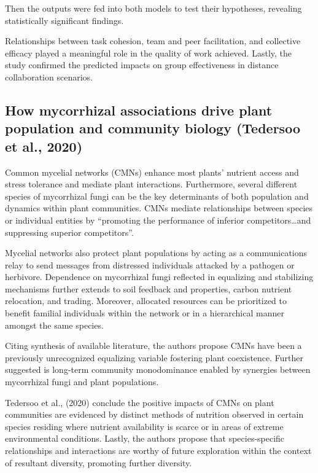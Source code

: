 \documentclass[sn-nature]{sn-jnl}%
\theoremstyle{thmstyleone}%
\theoremstyle{thmstyletwo}%
\theoremstyle{thmstylethree}%
\begin{document}
Then the outputs were fed into both models to test their hypotheses, revealing statistically significant findings.

Relationships between task cohesion, team and peer facilitation, and collective efficacy played a meaningful role in the quality of work achieved. Lastly, the study confirmed the predicted impacts on group effectiveness in distance collaboration scenarios. 


\subsection{How mycorrhizal associations drive plant population and community biology (Tedersoo et al., 2020)\cite{tedersoo_how_2020}}
Common mycelial networks (CMNs) enhance most plants' nutrient access and stress tolerance and mediate plant interactions. Furthermore, several different species of mycorrhizal fungi can be the key determinants of both population and dynamics within plant communities. CMNs mediate relationships between species or individual entities by “promoting the performance of inferior competitors…and suppressing superior competitors”\cite{tedersoo_how_2020}.

Mycelial networks also protect plant populations by acting as a communications relay to send messages from distressed individuals attacked by a pathogen or herbivore. Dependence on mycorrhizal fungi reflected in equalizing and stabilizing mechanisms further extends to soil feedback and properties, carbon nutrient relocation, and trading. Moreover, allocated resources can be prioritized to benefit familial individuals within the network or in a hierarchical manner amongst the same species\cite{tedersoo_how_2020}.

Citing synthesis of available literature, the authors propose CMNs have been a previously unrecognized equalizing variable fostering plant coexistence. Further suggested is long-term community monodominance enabled by synergies between mycorrhizal fungi and plant populations\cite{tedersoo_how_2020}.

Tedersoo et al., (2020) conclude the positive impacts of CMNs on plant communities are evidenced by distinct methods of nutrition observed in certain species residing where nutrient availability is scarce or in areas of extreme environmental conditions. Lastly, the authors propose that species-specific relationships and interactions are worthy of future exploration within the context of resultant diversity, promoting further diversity\cite{tedersoo_how_2020}.
\end{document}

